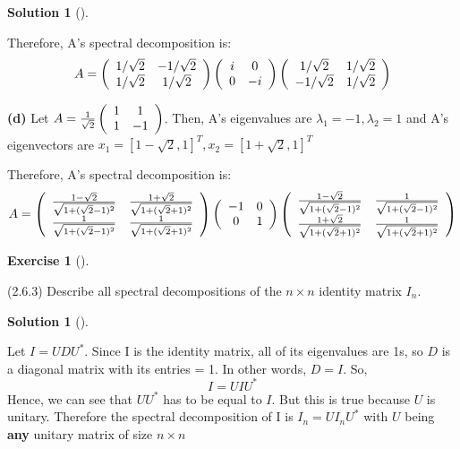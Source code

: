 \documentclass[numbers=enddot,12pt,final,onecolumn,notitlepage]{scrartcl}
\newcounter{exer}
\newcounter{sol}
\theoremstyle{definition}
\newtheorem{exmp}[exer]{Exercise}
\newenvironment{exercise}[1][]
{\begin{exmp}[#1]\begin{leftbar}}
        {\end{leftbar}\end{exmp}}
\newtheorem{solu}[sol]{Solution}
\newenvironment{solution}[1][]
{\begin{solu}[#1]\begin{leftbar}}
        {\end{leftbar}\end{solu}}
\begin{document}
\begin{solution}
	Therefore, A's spectral decomposition is:
	\[
		A = \left(\begin{array}
				[c]{cc}%
				1/\sqrt{2} & -1/\sqrt{2} \\
				1/\sqrt{2} & 1/\sqrt{2}
			\end{array}\right)
		\left(\begin{array}
				[c]{cc}%
				i & 0  \\
				0 & -i
			\end{array}\right)
		\left(\begin{array}
				[c]{cc}%
				1/\sqrt{2}  & 1/\sqrt{2} \\
				-1/\sqrt{2} & 1/\sqrt{2}
			\end{array}\right)
	\]


	\textbf{(d)} Let $A = \frac{1}{\sqrt{2}}\left(
		\begin{array}
				[c]{cc}%
				1 & 1  \\
				1 & -1
			\end{array}
		\right)$. Then, A's eigenvalues are $\lambda_1 = -1, \lambda_2 = 1$ and A's eigenvectors are $x_1 = [1 - \sqrt{2}, 1]^{T}, x_2 = [1 + \sqrt{2}, 1]^{T}$

	Therefore, A's spectral decomposition is:
	\[
		A = \left(\begin{array}
				[c]{cc}%
				\frac{1 - \sqrt{2}}{\sqrt{1+(\sqrt{2} - 1)^2}} & \frac{1 + \sqrt{2}}{\sqrt{1+(\sqrt{2} + 1)^2}} \\
				\frac{1}{\sqrt{1+(\sqrt{2} - 1)^2}}            & \frac{1}{\sqrt{1+(\sqrt{2} + 1)^2}}
			\end{array}\right)
		\left(\begin{array}
				[c]{cc}%
				-1 & 0 \\
				0  & 1
			\end{array}\right)
		\left(\begin{array}
				[c]{cc}%
				\frac{1 - \sqrt{2}}{\sqrt{1+(\sqrt{2} - 1)^2}} & \frac{1}{\sqrt{1+(\sqrt{2} - 1)^2}} \\
				\frac{1 + \sqrt{2}}{\sqrt{1+(\sqrt{2} + 1)^2}} & \frac{1}{\sqrt{1+(\sqrt{2} + 1)^2}}
			\end{array}\right)
	\]

\end{solution}

\begin{exercise}
	 (2.6.3) Describe all spectral decompositions of the $n\times n$ identity
	matrix $I_{n}$.
\end{exercise}

\begin{solution}
	Let $I = UDU^{\ast}$. Since I is the identity matrix, all of its eigenvalues are 1s, so $D$ is a diagonal matrix with its entries = 1. In other words, $D = I$. So,
	\[
		I = UIU^{\ast}
	\]
	Hence, we can see that $UU^{\ast}$ has to be equal to $I$. But this is true because $U$ is unitary. Therefore the spectral decomposition of I is $I_n = UI_nU^{\ast}$ with $U$ being \textbf{any} unitary matrix of size $n \times n$

\end{solution}
\end{document}
